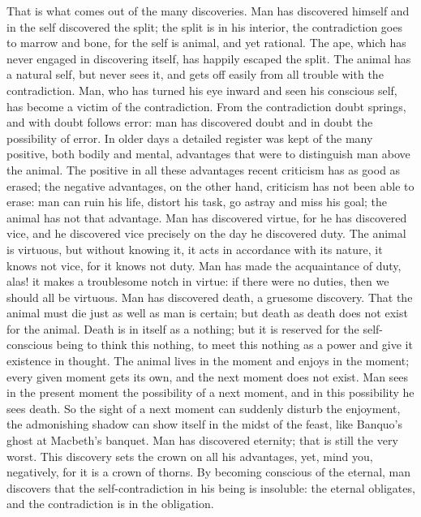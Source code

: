 \documentclass[12pt,a4paper,openany]{book}
\newcommand{\opage}[1]{\marginnote{\footnotesize\textit{[#1]}}}
\begin{document}
That is what comes out of the many discoveries. Man has discovered himself and in the self discovered the split; the split is
in his interior, the contradiction goes to marrow and bone, for the self is animal, and yet rational. The ape, which has never
engaged in discovering itself, has happily escaped the split. The animal has a natural self, but never sees it, and gets off
easily from all trouble with the contradiction. Man, who has turned his eye inward and seen his conscious self, has become a
victim of the contradiction. From the contradiction doubt springs, and with doubt follows error: man has discovered doubt and
in doubt the possibility of error. In older days a detailed register was kept of the many positive, both bodily and mental,
\setcounter{footnote}{0}%
\opage{38}advantages that were to distinguish man above the animal. The positive in all these advantages recent criticism has
as good as erased; the negative advantages, on the other hand, criticism has not been able to erase: man can ruin his life,
distort his task, go astray and miss his goal; the animal has not that advantage. Man has discovered virtue, for he has
discovered vice, and he discovered vice precisely on the day he discovered duty. The animal is virtuous, but without knowing
it, it acts in accordance with its nature, it knows not vice, for it knows not duty. Man has made the acquaintance of duty,
alas! it makes a troublesome notch in virtue: if there were no duties, then we should all be virtuous. Man has discovered
death, a gruesome discovery. That the animal must die just as well as man is certain; but death as death does not exist for
the animal. Death is in itself as a nothing; but it is reserved for the self-conscious being to think this nothing, to meet
this nothing as a power and give it existence in thought. The animal lives in the moment and enjoys in the moment; every given
moment gets its own, and the next moment does not exist. Man sees in the present moment the possibility of a next moment, and
in this possibility he sees death. So the sight of a next moment can suddenly disturb the enjoyment, the admonishing shadow
can show itself in the midst of the feast, like Banquo's ghost at Macbeth's banquet. Man has discovered eternity; that is
still the very worst. This discovery sets the crown on all his advantages, yet, mind you, negatively, for it is a crown of
thorns. By becoming conscious of the eternal, man discovers that the self-contradiction in his being is insoluble: the
eternal obligates, and the contradiction is in the obligation.
\end{document}
